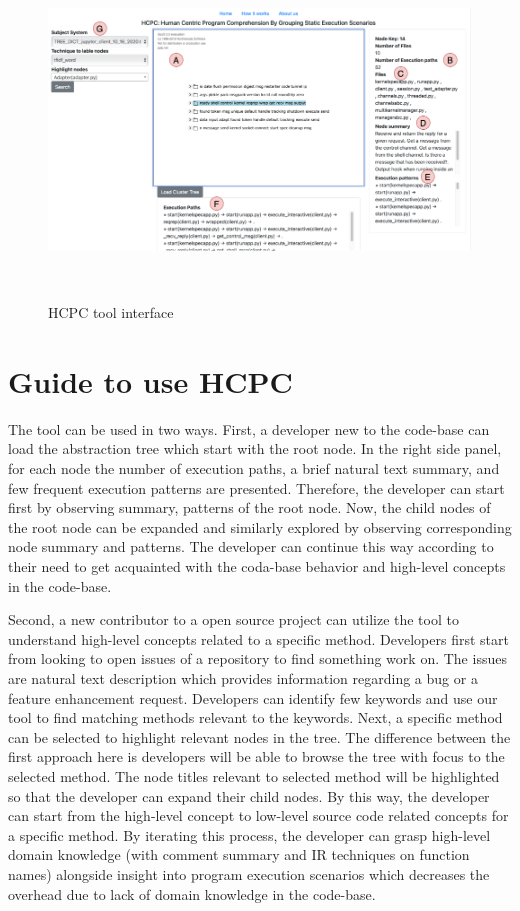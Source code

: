\begin{figure}[h]
  \centering
  \includegraphics[width=\columnwidth]{figures/hla3/hla3_interface.png}
  \caption{HCPC tool interface }~\label{fig:interface}
\end{figure}


\section{Guide to use HCPC}
The tool can be used in two ways. First, a developer new to the code-base can load the abstraction tree which start with the root node. In the right side panel, for each node the number of execution paths, a brief natural text summary, and few frequent execution patterns are presented. Therefore, the developer can start first by observing summary, patterns of the root node. Now, the child nodes of the root node can be expanded and  similarly explored by observing corresponding node summary and patterns. The developer can continue this way according to their need to get acquainted with the coda-base behavior and high-level concepts in the code-base.

Second, a new contributor to a open source project can utilize the tool to understand high-level concepts related to a specific method. Developers first start from looking to open issues of a repository to find something work on. The issues are natural text description which provides information regarding a bug or a feature enhancement request. Developers can identify few keywords and use our tool to find matching methods relevant to the keywords. Next, a specific method can be selected to highlight relevant nodes in the tree. The difference between the first approach here is developers will be able to browse the tree with focus to the selected method. The node titles relevant to selected method will be highlighted so that the developer can expand their child nodes. By this way, the developer can start from the high-level concept to low-level source code related concepts for a specific method. By iterating this process, the developer can grasp high-level domain knowledge (with comment summary and IR techniques on function names) alongside insight into program execution scenarios which decreases the overhead due to lack of domain knowledge in the code-base. 

